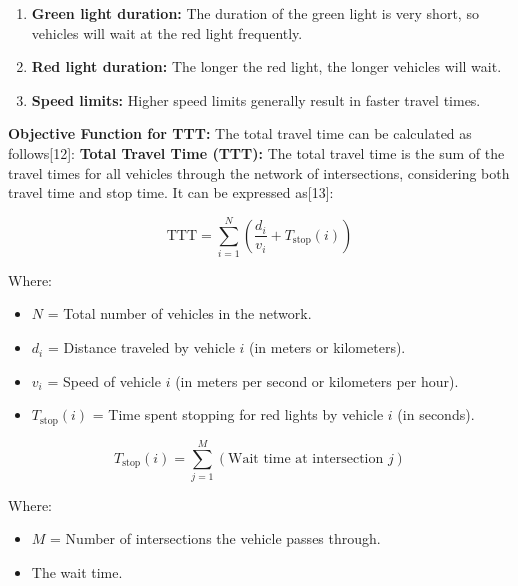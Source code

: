 \begin{enumerate}
    \item \textbf{Green light duration:} The duration of the green light is very short, so vehicles will wait at the red light frequently.
    \item \textbf{Red light duration:} The longer the red light, the longer vehicles will wait.
    \item \textbf{Speed limits:} Higher speed limits generally result in faster travel times.
\end{enumerate}
\textbf{Objective Function for TTT:} The total travel time can be calculated as follows[12]:
\textbf{Total Travel Time (TTT):} The total travel time is the sum of the travel times for all vehicles through the network of intersections, considering both travel time and stop time. It can be expressed as[13]:

\[
\text{TTT} = \sum_{i=1}^{N} \left( \frac{d_i}{v_i} + T_{\text{stop}}(i) \right)
\]

Where:
\begin{itemize}
    \item \( N \) = Total number of vehicles in the network.
    \item \( d_i \) = Distance traveled by vehicle \( i \) (in meters or kilometers).
    \item \( v_i \) = Speed of vehicle \( i \) (in meters per second or kilometers per hour).
    \item \( T_{\text{stop}}(i) \) = Time spent stopping for red lights by vehicle \( i \) (in seconds).
\end{itemize}

\[
T_{\text{stop}}(i) = \sum_{j=1}^{M} \left( \text{Wait time at intersection } j \right)
\]

Where:
\begin{itemize}
    \item \( M \) = Number of intersections the vehicle passes through.
    \item The wait time.
\end{itemize}

